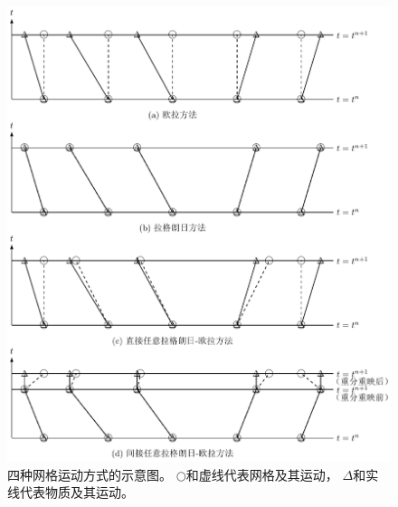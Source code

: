 \begin{figure}[htbp]
  \centering
  \includegraphics[width=\textwidth]{fig/tikz/EulerLagrange.pdf}
  \caption{四种网格运动方式的示意图。
    $\bigcirc$和虚线代表网格及其运动，
    $\Delta$和实线代表物质及其运动。
  }
  \label{fig:EulerLagrange}
\end{figure}

